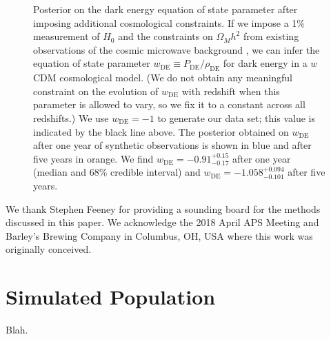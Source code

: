 \documentclass[modern]{aastex62}
\newcommand{\wDE}{w_\mathrm{DE}}
\newcommand{\wDEOneYear}{-0.91^{+0.15}_{-0.17}}
\newcommand{\wDEFiveYear}{-1.058^{+0.094}_{-0.101}}
\begin{document}
\begin{figure}
%
  \caption{\label{fig:wDE} Posterior on the dark energy equation of state
  parameter after imposing additional cosmological constraints.  If we impose a
  1\% measurement of $H_0$ \citep{Chen2017,Mortlock2018} and the constraints on
  $\Omega_M h^2$ from existing observations of the cosmic microwave background
  \citep{Planck2016}, we can infer the equation of state parameter $\wDE{}
  \equiv P_\mathrm{DE} / \rho_\mathrm{DE}$ for dark energy in a $w$CDM
  cosmological model.  (We do not obtain any meaningful constraint on the
  evolution of $\wDE{}$ with redshift when this parameter is allowed to vary, so
  we fix it to a constant across all redshifts.)  We use $\wDE{} = -1$ to
  generate our data set; this value is indicated by the black line above.  The
  posterior obtained on $\wDE{}$ after one year of synthetic observations is
  shown in blue and after five years in orange.  We find $\wDE{} =
  \wDEOneYear{}$ after one year (median and 68\% credible interval) and $\wDE{}
  = \wDEFiveYear{}$ after five years.}
%
\end{figure}

\acknowledgments

We thank Stephen Feeney for providing a sounding board for the methods discussed
in this paper.  We acknowledge the 2018 April APS Meeting and Barley's Brewing
Company in Columbus, OH, USA where this work was originally conceived.



\appendix

\section{Simulated Population}
\label{sec:simulated-population}

Blah.
\end{document}
